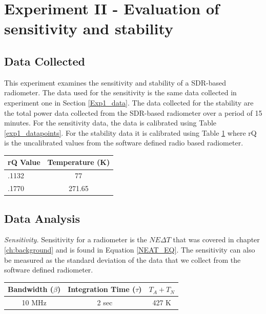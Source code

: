 \section{Experiment II - Evaluation of sensitivity and stability} \label{Exp2_results}

\subsection{Data Collected}
This experiment examines the sensitivity and stability of a SDR-based radiometer.  The data used for the sensitivity is the same data collected in experiment one in Section \ref{Exp1_data}.  The data collected for the stability are the total power data collected from the SDR-based radiometer over a period of 15 minutes.  For the sensitivity data, the data is calibrated using Table \ref{exp1_datapoints}.  For the stability data it is calibrated using Table \ref{exp2_datapoints} where rQ is the uncalibrated values from the software defined radio based radiometer.

\begin{table}[h!tb] \centering
{}
\label{exp2_datapoints}
\begin{tabular}{lc} \hline
\textbf{rQ Value} & \textbf{Temperature (K)} \\ \hline
.1132 & 77 \\
.1770 & 271.65 \\ \hline
\end{tabular}
\end{table}
 
\subsection{Data Analysis}\label{Exp2_analysis}

\emph{Sensitivity.}  Sensitivity for a radiometer is the $NE\Delta T$ that was covered in chapter \ref{ch:background} and is found in Equation \ref{NEAT_EQ}.  The sensitivity can also be measured as the standard deviation of the data that we collect from the software defined radiometer.  

\begin{table}[h!tb] \centering
{}
\label{exp2_param}
\begin{tabular}{ccc} \hline
\textbf{Bandwidth ($\beta$)} & \textbf{Integration Time ($\tau$)} & \textbf{$T_{A}+T_{N}$}\\ \hline
10 MHz & 2 sec & 427 K \\ \hline
\end{tabular}
\end{table}

